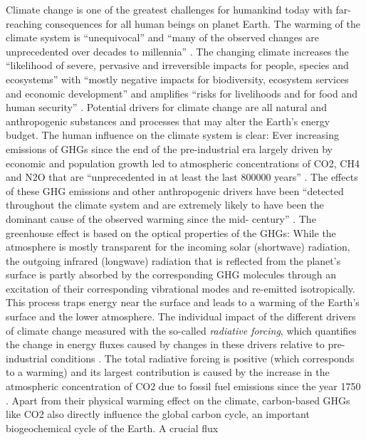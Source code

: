 Climate change is one of the greatest challenges for humankind today with
far-reaching consequences for all human beings on planet Earth. The warming of
the climate system is \enquote{unequivocal} and \enquote{many of the observed
  changes are unprecedented over decades to millennia} \autocite{IPCC2014}. The
changing climate increases the \enquote{likelihood of severe, pervasive and
  irreversible impacts for people, species and ecosystems} with \enquote{mostly
  negative impacts for biodiversity, ecosystem services and economic
  development} and amplifies \enquote{risks for livelihoods and for food and
  human security} \autocite{IPCC2014}. Potential drivers for climate change
are all natural and anthropogenic substances and processes that may alter the
Earth's energy budget. The human influence on the climate system is clear: Ever
increasing emissions of \acp{GHG} since the end of the pre-industrial era
largely driven by economic and population growth led to atmospheric
concentrations of \ac{CO2}, \ac{CH4} and \ac{N2O} that are
\enquote{unprecedented in at least the last 800000 years} \autocite{IPCC2014}.
The effects of these \ac{GHG} emissions and other anthropogenic drivers have
been \enquote{detected throughout the climate system and are extremely likely
  to have been the dominant cause of the observed warming since the
  mid- century} \autocite{IPCC2014}. The greenhouse effect is based on
the optical properties of the \acp{GHG}: While the atmosphere is mostly
transparent for the incoming solar (shortwave) radiation, the outgoing
infrared (longwave) radiation that is reflected from the planet's surface is
partly absorbed by the corresponding \ac{GHG} molecules through an excitation
of their corresponding vibrational modes and re-emitted isotropically. This
process traps energy near the surface and leads to a warming of the Earth's
surface and the lower atmosphere. The individual impact of the different
drivers of climate change measured with the so-called \emph{radiative
forcing}, which quantifies the change in energy fluxes caused by changes in
these drivers relative to pre-industrial conditions \autocite{IPCC2013}. The
total radiative forcing is positive (which corresponds to a warming) and its
largest contribution is caused by the increase in the atmospheric
concentration of \ac{CO2} due to fossil fuel emissions since the year 1750
\autocite{IPCC2014}. Apart from their physical warming effect on the climate,
carbon-based \acp{GHG} like \ac{CO2} also directly influence the global
carbon cycle, an important biogeochemical cycle of the Earth. A crucial flux
